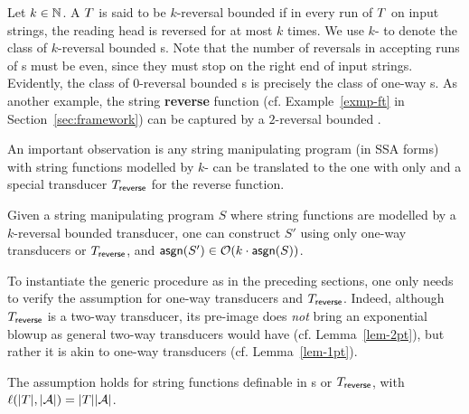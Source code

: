 %

 
Let $k \in \mathbb{N}$. A \PPT{} $T$ is said  to be $k$-reversal bounded if in every run of $T$ on input strings, the reading head is reversed for at most $k$ times. We use  $k$-\RBPPT{} to denote the class of $k$-reversal bounded \PPT{}s. Note that the number of reversals in accepting runs of \PPT{}s must be even, since they must stop on the right end of input strings.
Evidently, the class of $0$-reversal bounded \PPT{}s is precisely the class of one-way \PT{}s.   
%
As another example, the string \textbf{reverse} function (cf. Example~\ref{exmp-ft} in Section~\ref{sec:framework}) can be captured by a $2$-reversal bounded \PPT.

An important observation is  any string manipulating program (in SSA forms) with string functions modelled by  $k$-\RBPPT{} can be translated to the one with only \PT{} and a special transducer $T_{\sf reverse}$ for the reverse function.  

\begin{proposition} \label{prop:trans}
	Given a string manipulating program $S$ where  string functions are modelled by a $k$-reversal bounded transducer, one can construct $S'$ using only one-way transducers or  $T_{\sf reverse}$, and $ \mathsf{asgn}(S')\in \mathcal{O}(k\cdot \mathsf{asgn}(S))$. 
\end{proposition}

%
To instantiate the generic procedure as in the preceding sections, one only needs to verify the  \prerec{} assumption for one-way transducers and $T_{\sf reverse}$. Indeed, although $T_{\sf reverse}$ is a two-way transducer, its pre-image does \emph{not} bring an exponential blowup as general two-way transducers would have (cf. Lemma~\ref{lem-2pt}), but rather it is akin to one-way transducers (cf. Lemma~\ref{lem-1pt}). 

\begin{lemma}\label{lem-1pt}
	The \prerec{} assumption holds for string functions definable in \PT{}s or $T_{\sf reverse}$, with $\ell(|T|, |\mathcal{A}|) = |T||\mathcal{A}|$.
\end{lemma}

